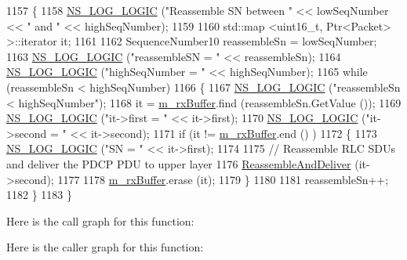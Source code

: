 \begin{DoxyCode}
1157 \{
1158   \hyperlink{group__logging_ga88acd260151caf2db9c0fc84997f45ce}{NS\_LOG\_LOGIC} (\textcolor{stringliteral}{"Reassemble SN between "} << lowSeqNumber << \textcolor{stringliteral}{" and "} << highSeqNumber);
1159 
1160   std::map <uint16\_t, Ptr<Packet> >::iterator it;
1161 
1162   SequenceNumber10 reassembleSn = lowSeqNumber;
1163   \hyperlink{group__logging_ga88acd260151caf2db9c0fc84997f45ce}{NS\_LOG\_LOGIC} (\textcolor{stringliteral}{"reassembleSN = "} << reassembleSn);
1164   \hyperlink{group__logging_ga88acd260151caf2db9c0fc84997f45ce}{NS\_LOG\_LOGIC} (\textcolor{stringliteral}{"highSeqNumber = "} << highSeqNumber);
1165   \textcolor{keywordflow}{while} (reassembleSn < highSeqNumber)
1166     \{
1167       \hyperlink{group__logging_ga88acd260151caf2db9c0fc84997f45ce}{NS\_LOG\_LOGIC} (\textcolor{stringliteral}{"reassembleSn < highSeqNumber"});
1168       it = \hyperlink{classns3_1_1LteRlcUmLowLat_aedc712a69598a77115ae9a67133b53d8}{m\_rxBuffer}.find (reassembleSn.GetValue ());
1169       \hyperlink{group__logging_ga88acd260151caf2db9c0fc84997f45ce}{NS\_LOG\_LOGIC} (\textcolor{stringliteral}{"it->first  = "} << it->first);
1170       \hyperlink{group__logging_ga88acd260151caf2db9c0fc84997f45ce}{NS\_LOG\_LOGIC} (\textcolor{stringliteral}{"it->second = "} << it->second);
1171       \textcolor{keywordflow}{if} (it != \hyperlink{classns3_1_1LteRlcUmLowLat_aedc712a69598a77115ae9a67133b53d8}{m\_rxBuffer}.end () )
1172         \{
1173           \hyperlink{group__logging_ga88acd260151caf2db9c0fc84997f45ce}{NS\_LOG\_LOGIC} (\textcolor{stringliteral}{"SN = "} << it->first);
1174 
1175           \textcolor{comment}{// Reassemble RLC SDUs and deliver the PDCP PDU to upper layer}
1176           \hyperlink{classns3_1_1LteRlcUmLowLat_a73c311a5f9cb06e61282da24f875bb29}{ReassembleAndDeliver} (it->second);
1177 
1178           \hyperlink{classns3_1_1LteRlcUmLowLat_aedc712a69598a77115ae9a67133b53d8}{m\_rxBuffer}.erase (it);
1179         \}
1180         
1181       reassembleSn++;
1182     \}
1183 \}
\end{DoxyCode}


Here is the call graph for this function\+:




Here is the caller graph for this function\+:


